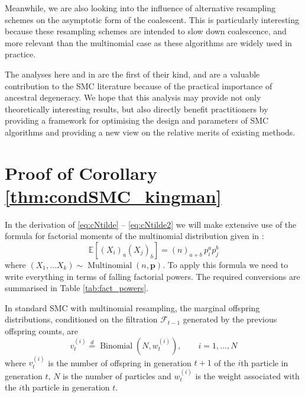 \documentclass[fleqn]{article}
\theoremstyle{definition}
\newcommand{\E}{\mathbb{E}}
\newcommand{\eqdist}{\overset{d}{=}}
\newcommand{\Mn}{\operatorname{Multinomial}}
\newcommand{\Bin}{\operatorname{Binomial}}
\newcommand{\F}{\mathcal{F}_{t-1}}
\newcommand{\vt}[2][t]{v_{#1}^{(#2)}}
\newcommand{\wt}[2][t]{w_{#1}^{(#2)}}
\begin{document}
Meanwhile, we are also looking into the influence of alternative resampling schemes on the asymptotic form of the coalescent. This is particularly interesting because these resampling schemes are intended to slow down coalescence, and more relevant than the multinomial case as these algorithms are widely used in practice.

The analyses here and in \citet{koskela2018} are the first of their kind, and are a valuable contribution to the SMC literature because of the practical importance of ancestral degeneracy. We hope that this analysis may provide not only theoretically interesting results, but also directly benefit practitioners by providing a framework for optimising the design and parameters of SMC algorithms and providing a new view on the relative merits of existing methods.


\appendix
\section{Proof of Corollary \ref{thm:condSMC_kingman}}\label{sec:proof_conditional}
In the derivation of \eqref{eq:cNtilde} -- \eqref{eq:cNtilde2} we will make extensive use of the formula for factorial moments of the multinomial distribution given in \citet[p.67]{mosimann1962}:
\begin{equation} \label{eq:mn_moments}
\E[(X_i)_a(X_j)_b] = (n)_{a+b}\, p_i^a p_j^b
\end{equation}
where $(X_1,\dots X_k) \sim \Mn(n, \mathbf{p})$.
To apply this formula we need to write everything in terms of falling factorial powers. The required conversions are summarised in Table \ref{tab:fact_powers}.

In standard SMC with multinomial resampling, the marginal offspring distributions, conditioned on the filtration $\F$ generated by the previous offspring counts, are
\begin{equation*}
\vt{i} \eqdist \Bin (N, \wt{i}), \qquad i=1,\dots,N
\end{equation*}
where $\vt{i}$ is the number of offspring in generation $t+1$ of the $i$th particle in generation $t$, $N$ is the number of particles and $\wt{i}$ is the weight associated with the $i$th particle in generation $t$.
\end{document}
